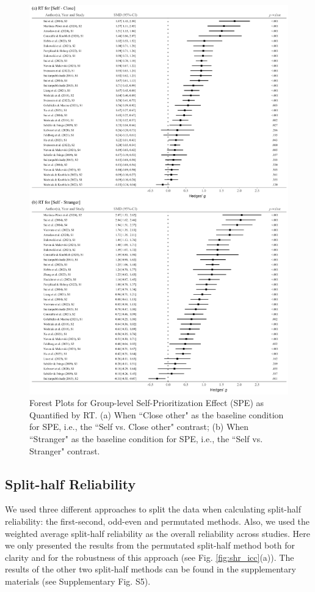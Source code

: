 \documentclass[sn-apa]{sn-jnl}%
\theoremstyle{thmstyleone}%
\theoremstyle{thmstyletwo}%
\theoremstyle{thmstylethree}%
\begin{document}
\begin{figure}[!hb]
	\centering
	\includegraphics[width=1\textwidth]{./Figure/Fig_3_Forest_RT.png}
	\caption{Forest Plots for Group-level Self-Prioritization Effect (SPE) as Quantified by RT. (a) When ``Close other" as the baseline condition for SPE, i.e., the ``Self vs. Close other" contrast; (b) When ``Stranger" as the baseline condition for SPE, i.e., the ``Self vs. Stranger" contrast.}
	\label{fig:meta_RT}
\end{figure}
\clearpage

\subsection{Split-half Reliability}\label{subsec:split}

We used three different approaches to split the data when calculating split-half reliability: the first-second, odd-even and permutated methods. Also, we used the weighted average split-half reliability as the overall reliability across studies. Here we only presented the results from the permutated split-half method both for clarity and for the robustness of this approach \parencite{pronk2022methods} (see Fig. \ref{fig:shr_icc}(a)). The results of the other two split-half methods can be found in the supplementary materials (see Supplementary Fig. S5).
\end{document}
